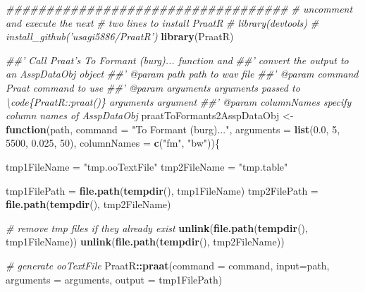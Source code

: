\documentclass[]{book}
\newenvironment{Shaded}{\begin{snugshade}}{\end{snugshade}}
\newcommand{\CommentTok}[1]{\textcolor[rgb]{0.56,0.35,0.01}{\textit{#1}}}
\newcommand{\ControlFlowTok}[1]{\textcolor[rgb]{0.13,0.29,0.53}{\textbf{#1}}}
\newcommand{\DataTypeTok}[1]{\textcolor[rgb]{0.13,0.29,0.53}{#1}}
\newcommand{\DecValTok}[1]{\textcolor[rgb]{0.00,0.00,0.81}{#1}}
\newcommand{\FloatTok}[1]{\textcolor[rgb]{0.00,0.00,0.81}{#1}}
\newcommand{\KeywordTok}[1]{\textcolor[rgb]{0.13,0.29,0.53}{\textbf{#1}}}
\newcommand{\NormalTok}[1]{#1}
\newcommand{\OperatorTok}[1]{\textcolor[rgb]{0.81,0.36,0.00}{\textbf{#1}}}
\newcommand{\StringTok}[1]{\textcolor[rgb]{0.31,0.60,0.02}{#1}}
\begin{document}
\begin{Shaded}
\begin{Highlighting}[]
\CommentTok{###################################}
\CommentTok{# uncomment and execute the next}
\CommentTok{# two lines to install PraatR}
\CommentTok{# library(devtools)}
\CommentTok{# install_github('usagi5886/PraatR')}
\KeywordTok{library}\NormalTok{(PraatR)}

\CommentTok{##' Call Praat's To Formant (burg)... function and}
\CommentTok{##' convert the output to an AsspDataObj object}
\CommentTok{##' @param path path to wav file}
\CommentTok{##' @param command Praat command to use}
\CommentTok{##' @param arguments arguments passed to \textbackslash{}code\{PraatR::praat()\} arguments argument}
\CommentTok{##' @param columnNames specify column names of AsspDataObj}
\NormalTok{praatToFormants2AsspDataObj <-}\StringTok{ }\ControlFlowTok{function}\NormalTok{(path,}
                                        \DataTypeTok{command =} \StringTok{"To Formant (burg)..."}\NormalTok{,}
                                        \DataTypeTok{arguments =} \KeywordTok{list}\NormalTok{(}\FloatTok{0.0}\NormalTok{,}
                                                         \DecValTok{5}\NormalTok{,}
                                                         \DecValTok{5500}\NormalTok{,}
                                                         \FloatTok{0.025}\NormalTok{,}
                                                         \DecValTok{50}\NormalTok{),}
                                        \DataTypeTok{columnNames =} \KeywordTok{c}\NormalTok{(}\StringTok{"fm"}\NormalTok{, }\StringTok{"bw"}\NormalTok{))\{}

\NormalTok{  tmp1FileName =}\StringTok{ "tmp.ooTextFile"}
\NormalTok{  tmp2FileName =}\StringTok{ "tmp.table"}

\NormalTok{  tmp1FilePath =}\StringTok{ }\KeywordTok{file.path}\NormalTok{(}\KeywordTok{tempdir}\NormalTok{(), tmp1FileName)}
\NormalTok{  tmp2FilePath =}\StringTok{ }\KeywordTok{file.path}\NormalTok{(}\KeywordTok{tempdir}\NormalTok{(), tmp2FileName)}

  \CommentTok{# remove tmp files if they already exist}
  \KeywordTok{unlink}\NormalTok{(}\KeywordTok{file.path}\NormalTok{(}\KeywordTok{tempdir}\NormalTok{(), tmp1FileName))}
  \KeywordTok{unlink}\NormalTok{(}\KeywordTok{file.path}\NormalTok{(}\KeywordTok{tempdir}\NormalTok{(), tmp2FileName))}

  \CommentTok{# generate ooTextFile}
\NormalTok{  PraatR}\OperatorTok{::}\KeywordTok{praat}\NormalTok{(}\DataTypeTok{command =}\NormalTok{ command,}
                \DataTypeTok{input=}\NormalTok{path,}
                \DataTypeTok{arguments =}\NormalTok{ arguments,}
                \DataTypeTok{output =}\NormalTok{ tmp1FilePath)}


\end{Highlighting}
\end{Shaded}
\end{document}
